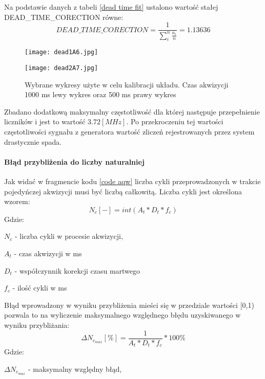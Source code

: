 Na podstawie danych z tabeli \ref{dead time fit} ustalono wartość stałej DEAD\_TIME\_CORECTION równe:
\begin{equation}
        \label{dead time eq}
        DEAD\_TIME\_CORECTION = \frac{1}{\sum^n_i \frac{a_i}{n}} = 1.13636
\end{equation} 

\begin{figure}
        \centering
        \begin{multicols}{2}
                \texttt{[image: dead1A6.jpg]} \par
                \texttt{[image: dead2A7.jpg]} \par
        \end{multicols}
        \caption{Wybrane wykresy użyte w celu kalibracji układu. Czas akwizycji 1000 ms lewy wykres oraz 500 ms prawy wykres}
        \label{wykresy fit calib}
\end{figure}

Zbadano dodatkową maksymalny częstotliwość dla której następuje przepełnienie liczników i jest to wartość $3.72 [MHz]$. Po przekroczeniu tej wartości częstotliwości sygnału z  generatora wartość zliczeń rejestrowanych przez system drastycznie spada. 

\paragraph{Błąd przybliżenia do liczby naturalniej}
Jak widać w fragmencie kodu \ref{code aqw} liczba cykli przeprowadzonych w trakcie pojedyńczej akwizycji musi być liczbą całkowitą. Liczba cykli jest określona wzorem:
\begin{equation}
        N_c [-] = int(A_t*D_t*f_c)
\end{equation}
Gdzie:
\begin{description}
        \item $N_c$ - liczba cykli w procesie akwizycji,
        \item $A_t$ - czas  akwizycji w ms
        \item $D_t$ - współczynnik korekcji czasu martwego 
        \item $f_c$ - ilość cykli w ms
\end{description}

Błąd wprowadzony w wyniku przybliżenia mieści się w przedziale wartości [0,1) pozwala to na wyliczenie maksymalnego względnego błędu uzyskiwanego w wyniku przybliżania:
\begin{equation}
        \Delta N_{c_{max}} [\%] = \frac{1}{A_t*D_t*f_c}  * 100\%
\end{equation} 
Gdzie:
\begin{description}
        \item $\Delta N_{c_{max}}$ - maksymalny względny błąd,
\end{description}


